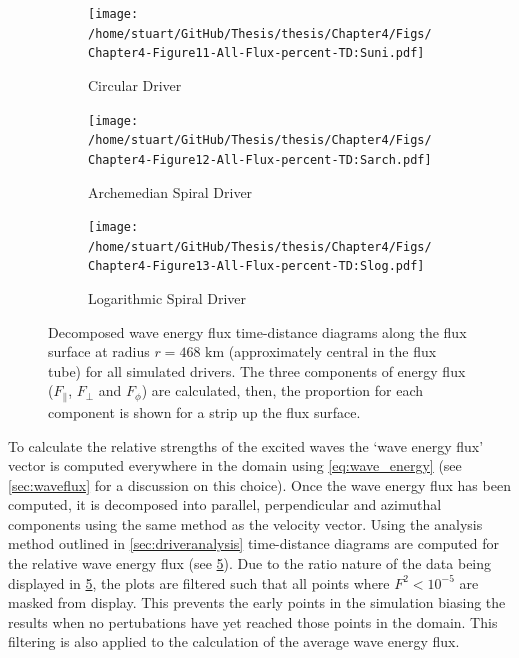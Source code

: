 \documentclass[a4paper,12pt,fourier,authoryear,custommargin]{Classes/PhDThesisPSnPDF}
\begin{document}
\begin{figure}
    \centering
\ContinuedFloat
    

    \begin{subfigure}[b]{0.9\columnwidth}
        \texttt{[image: /home/stuart/GitHub/Thesis/thesis/Chapter4/Figs/Chapter4-Figure11-All-Flux-percent-TD:Suni.pdf]}
        \caption{Circular Driver}
        \label{fig:All-Flux-percent-TD:Suni}
    \end{subfigure}

    \begin{subfigure}[b]{0.9\columnwidth}
        \texttt{[image: /home/stuart/GitHub/Thesis/thesis/Chapter4/Figs/Chapter4-Figure12-All-Flux-percent-TD:Sarch.pdf]}
        \caption{Archemedian Spiral Driver}
        \label{fig:All-Flux-percent-TD:Sarch}
    \end{subfigure}
    \caption{}
    \label{fig:}
\end{figure}

\begin{figure}
    \centering
\ContinuedFloat
    

    \begin{subfigure}[b]{0.9\columnwidth}
        \texttt{[image: /home/stuart/GitHub/Thesis/thesis/Chapter4/Figs/Chapter4-Figure13-All-Flux-percent-TD:Slog.pdf]}
        \caption{Logarithmic Spiral Driver}
        \label{fig:All-Flux-percent-TD:Slog}
    \end{subfigure}
    \caption{Decomposed wave energy flux time-distance diagrams along the flux surface at radius $r = 468$ km (approximately central in the flux tube) for all simulated drivers. The three components of energy flux ($F_\parallel$, $F_\perp$ and $F_\phi$) are calculated, then, the proportion for each component is shown for a strip up the flux surface.}
    \label{fig:All-Flux-percent-TD}
\end{figure}

To calculate the relative strengths of the excited waves the `wave energy flux' vector is computed everywhere in the domain using \cref{eq:wave_energy} (see \cref{sec:waveflux} for a discussion on this choice).
Once the wave energy flux has been computed, it is decomposed into parallel, perpendicular and azimuthal components using the same method as the velocity vector.
Using the analysis method outlined in \cref{sec:driveranalysis} time-distance diagrams are computed for the relative wave energy flux (see \cref{fig:All-Flux-percent-TD}).
Due to the ratio nature of the data being displayed in \cref{fig:All-Flux-percent-TD}, the plots are filtered such that all points where $F^2 < 10^{-5}$ are masked from display.
This prevents the early points in the simulation biasing the results when no pertubations have yet reached those points in the domain.
This filtering is also applied to the calculation of the average wave energy flux.
\end{document}
